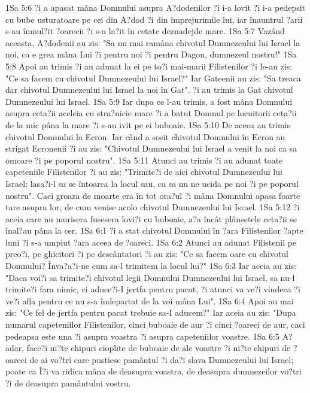 1Sa 5:6  ?i a apasat mâna Domnului asupra A?dodenilor ?i i-a lovit ?i i-a pedepsit cu bube usturatoare pe cei din A?dod ?i din împrejurimile lui, iar înauntrul ?arii s-au înmul?it ?oarecii ?i s-a la?it în cetate deznadejde mare.
1Sa 5:7  Vazând aceasta, A?dodenii au zis: "Sa nu mai ramâna chivotul Dumnezeului lui Israel la noi, ca e grea mâna Lui ?i pentru noi ?i pentru Dagon, dumnezeul nostru!"
1Sa 5:8  Apoi au trimis ?i au adunat la ei pe to?i mai-marii Filistenilor ?i le-au zis: "Ce sa facem cu chivotul Dumnezeului lui Israel?" Iar Gateenii au zis: "Sa treaca dar chivotul Dumnezeului lui Israel la noi în Gat". ?i au trimis la Gat chivotul Dumnezeului lui Israel.
1Sa 5:9  Iar dupa ce l-au trimis, a fost mâna Domnului asupra ceta?ii aceleia cu stra?nicie mare ?i a batut Domnul pe locuitorii ceta?ii de la mic pâna la mare ?i s-au ivit pe ei buboaie.
1Sa 5:10  De aceea au trimis chivotul Domnului la Ecron. Iar când a sosit chivotul Domnului în Ecron au strigat Ecronenii ?i au zis: "Chivotul Dumnezeului lui Israel a venit la noi ca sa omoare ?i pe poporul nostru".
1Sa 5:11  Atunci au trimis ?i au adunat toate capeteniile Filistenilor ?i au zis: "Trimite?i de aici chivotul Dumnezeului lui Israel; lasa?i-l sa se întoarca la locul sau, ca sa nu ne ucida pe noi ?i pe poporul nostru". Caci groaza de moarte era în tot ora?ul ?i mâna Domnului apasa foarte tare asupra lor, de cum venise acolo chivotul Dumnezeului lui Israel.
1Sa 5:12  ?i aceia care nu murisera fusesera lovi?i cu buboaie, a?a încât plânsetele ceta?ii se înal?au pâna la cer.
1Sa 6:1  ?i a stat chivotul Domnului în ?ara Filistenilor ?apte luni ?i s-a umplut ?ara aceea de ?oareci.
1Sa 6:2  Atunci au adunat Filistenii pe preo?i, pe ghicitori ?i pe descântatori ?i au zis: "Ce sa facem oare cu chivotul Domnului? Înva?a?i-ne cum sa-l trimitem la locul lui?"
1Sa 6:3  Iar aceia au zis: "Daca voi?i sa trimite?i chivotul legii Domnului Dumnezeului lui Israel, sa nu-l trimite?i fara nimic, ci aduce?i-I jertfa pentru pacat, ?i atunci va ve?i vindeca ?i ve?i afla pentru ce nu s-a îndepartat de la voi mâna Lui".
1Sa 6:4  Apoi au mai zis: "Ce fel de jertfa pentru pacat trebuie sa-I aducem?" Iar aceia au zis: "Dupa numarul capeteniilor Filistenilor, cinci buboaie de aur ?i cinci ?oareci de aur, caci pedeapsa este una ?i asupra voastra ?i asupra capeteniilor voastre.
1Sa 6:5  A?adar, face?i ni?te chipuri cioplite de buboaie de ale voastre ?i ni?te chipuri de ?oareci de ai vo?tri care pustiesc pamântul ?i da?i slava Dumnezeului lui Israel; poate ca Î?i va ridica mâna de deasupra voastra, de deasupra dumnezeilor vo?tri ?i de deasupra pamântului vostru.
